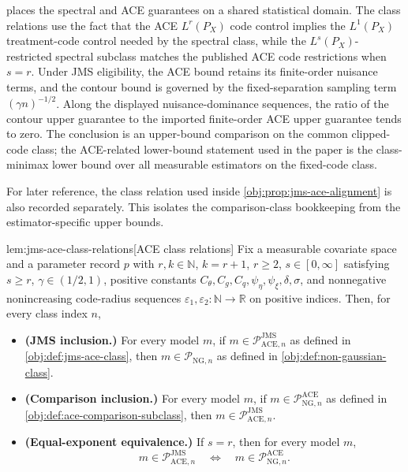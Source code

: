  places the spectral and ACE guarantees on a shared statistical domain. The class relations use the fact that the ACE \(L^r(P_X)\) code control implies the \(L^1(P_X)\) treatment-code control needed by the spectral class, while the \(L^s(P_X)\)-restricted spectral subclass matches the published ACE code restrictions when \(s=r\). Under JMS eligibility, the ACE bound retains its finite-order nuisance terms, and the contour bound is governed by the fixed-separation sampling term \((\gamma n)^{-1/2}\). Along the displayed nuisance-dominance sequences, the ratio of the contour upper guarantee to the imported finite-order ACE upper guarantee tends to zero. The conclusion is an upper-bound comparison on the common clipped-code class; the ACE-related lower-bound statement used in the paper is the class-minimax lower bound over all measurable estimators on the fixed-code class.

For later reference, the class relation used inside \cref{obj:prop:jms-ace-alignment} is also recorded separately. This isolates the comparison-class bookkeeping from the estimator-specific upper bounds.

\begin{lemmav}{lem:jms-ace-class-relations}[ACE class relations]
Fix a measurable covariate space and a parameter record \(p\) with \(r,k\in\mathbb N\), \(k=r+1\), \(r\ge2\), \(s\in[0,\infty]\) satisfying \(s\ge r\), \(\gamma\in(1/2,1)\), positive constants \(C_{\theta},C_g,C_q,\psi_{\eta},\psi_{\xi},\delta,\sigma\), and nonnegative nonincreasing code-radius sequences \(\varepsilon_1,\varepsilon_2:\mathbb N\to\mathbb R\) on positive indices.  Then, for every class index \(n\),
\begin{itemize}
\item \textbf{(JMS inclusion.)} For every model \(m\), if \(m\in\mathcal P_{\mathrm{ACE},n}^{\mathrm{JMS}}\) as defined in \cref{obj:def:jms-ace-class}, then \(m\in\mathcal P_{\mathrm{NG},n}\) as defined in \cref{obj:def:non-gaussian-class}.
\item \textbf{(Comparison inclusion.)} For every model \(m\), if \(m\in\mathcal P_{\mathrm{NG},n}^{\mathrm{ACE}}\) as defined in \cref{obj:def:ace-comparison-subclass}, then \(m\in\mathcal P_{\mathrm{ACE},n}^{\mathrm{JMS}}\).
\item \textbf{(Equal-exponent equivalence.)} If \(s=r\), then for every model \(m\),
\[
m\in\mathcal P_{\mathrm{ACE},n}^{\mathrm{JMS}}
\quad\Longleftrightarrow\quad
m\in\mathcal P_{\mathrm{NG},n}^{\mathrm{ACE}} .
\]
\end{itemize}
\end{lemmav}

